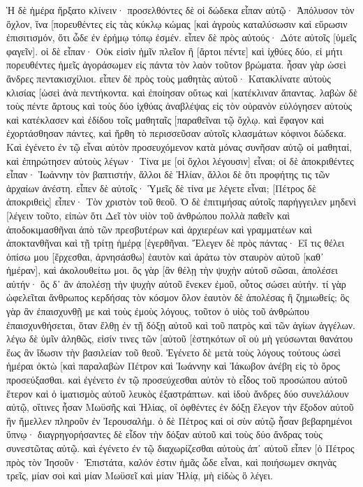 Ἡ δὲ ἡμέρα ἤρξατο κλίνειν· προσελθόντες δὲ οἱ δώδεκα εἶπαν αὐτῷ· Ἀπόλυσον τὸν ὄχλον, ἵνα [πορευθέντες εἰς τὰς κύκλῳ κώμας [καὶ ἀγροὺς καταλύσωσιν καὶ εὕρωσιν ἐπισιτισμόν, ὅτι ὧδε ἐν ἐρήμῳ τόπῳ ἐσμέν. 
εἶπεν δὲ πρὸς αὐτούς· Δότε αὐτοῖς [ὑμεῖς φαγεῖν]. οἱ δὲ εἶπαν· Οὐκ εἰσὶν ἡμῖν πλεῖον ἢ [ἄρτοι πέντε] καὶ ἰχθύες δύο, εἰ μήτι πορευθέντες ἡμεῖς ἀγοράσωμεν εἰς πάντα τὸν λαὸν τοῦτον βρώματα. 
ἦσαν γὰρ ὡσεὶ ἄνδρες πεντακισχίλιοι. εἶπεν δὲ πρὸς τοὺς μαθητὰς αὐτοῦ· Κατακλίνατε αὐτοὺς κλισίας [ὡσεὶ ἀνὰ πεντήκοντα. 
καὶ ἐποίησαν οὕτως καὶ [κατέκλιναν ἅπαντας. 
λαβὼν δὲ τοὺς πέντε ἄρτους καὶ τοὺς δύο ἰχθύας ἀναβλέψας εἰς τὸν οὐρανὸν εὐλόγησεν αὐτοὺς καὶ κατέκλασεν καὶ ἐδίδου τοῖς μαθηταῖς [παραθεῖναι τῷ ὄχλῳ. 
καὶ ἔφαγον καὶ ἐχορτάσθησαν πάντες, καὶ ἤρθη τὸ περισσεῦσαν αὐτοῖς κλασμάτων κόφινοι δώδεκα. 
Καὶ ἐγένετο ἐν τῷ εἶναι αὐτὸν προσευχόμενον κατὰ μόνας συνῆσαν αὐτῷ οἱ μαθηταί, καὶ ἐπηρώτησεν αὐτοὺς λέγων· Τίνα με [οἱ ὄχλοι λέγουσιν] εἶναι; 
οἱ δὲ ἀποκριθέντες εἶπαν· Ἰωάννην τὸν βαπτιστήν, ἄλλοι δὲ Ἠλίαν, ἄλλοι δὲ ὅτι προφήτης τις τῶν ἀρχαίων ἀνέστη. 
εἶπεν δὲ αὐτοῖς· Ὑμεῖς δὲ τίνα με λέγετε εἶναι; [Πέτρος δὲ ἀποκριθεὶς] εἶπεν· Τὸν χριστὸν τοῦ θεοῦ. 
Ὁ δὲ ἐπιτιμήσας αὐτοῖς παρήγγειλεν μηδενὶ [λέγειν τοῦτο, 
εἰπὼν ὅτι Δεῖ τὸν υἱὸν τοῦ ἀνθρώπου πολλὰ παθεῖν καὶ ἀποδοκιμασθῆναι ἀπὸ τῶν πρεσβυτέρων καὶ ἀρχιερέων καὶ γραμματέων καὶ ἀποκτανθῆναι καὶ τῇ τρίτῃ ἡμέρᾳ [ἐγερθῆναι. 
Ἔλεγεν δὲ πρὸς πάντας· Εἴ τις θέλει ὀπίσω μου [ἔρχεσθαι, ἀρνησάσθω] ἑαυτὸν καὶ ἀράτω τὸν σταυρὸν αὐτοῦ [καθ᾽ ἡμέραν], καὶ ἀκολουθείτω μοι. 
ὃς γὰρ [ἂν θέλῃ τὴν ψυχὴν αὐτοῦ σῶσαι, ἀπολέσει αὐτήν· ὃς δ᾽ ἂν ἀπολέσῃ τὴν ψυχὴν αὐτοῦ ἕνεκεν ἐμοῦ, οὗτος σώσει αὐτήν. 
τί γὰρ ὠφελεῖται ἄνθρωπος κερδήσας τὸν κόσμον ὅλον ἑαυτὸν δὲ ἀπολέσας ἢ ζημιωθείς; 
ὃς γὰρ ἂν ἐπαισχυνθῇ με καὶ τοὺς ἐμοὺς λόγους, τοῦτον ὁ υἱὸς τοῦ ἀνθρώπου ἐπαισχυνθήσεται, ὅταν ἔλθῃ ἐν τῇ δόξῃ αὐτοῦ καὶ τοῦ πατρὸς καὶ τῶν ἁγίων ἀγγέλων. 
λέγω δὲ ὑμῖν ἀληθῶς, εἰσίν τινες τῶν [αὐτοῦ [ἑστηκότων οἳ οὐ μὴ γεύσωνται θανάτου ἕως ἂν ἴδωσιν τὴν βασιλείαν τοῦ θεοῦ. 
Ἐγένετο δὲ μετὰ τοὺς λόγους τούτους ὡσεὶ ἡμέραι ὀκτὼ [καὶ παραλαβὼν Πέτρον καὶ Ἰωάννην καὶ Ἰάκωβον ἀνέβη εἰς τὸ ὄρος προσεύξασθαι. 
καὶ ἐγένετο ἐν τῷ προσεύχεσθαι αὐτὸν τὸ εἶδος τοῦ προσώπου αὐτοῦ ἕτερον καὶ ὁ ἱματισμὸς αὐτοῦ λευκὸς ἐξαστράπτων. 
καὶ ἰδοὺ ἄνδρες δύο συνελάλουν αὐτῷ, οἵτινες ἦσαν Μωϋσῆς καὶ Ἠλίας, 
οἳ ὀφθέντες ἐν δόξῃ ἔλεγον τὴν ἔξοδον αὐτοῦ ἣν ἤμελλεν πληροῦν ἐν Ἰερουσαλήμ. 
ὁ δὲ Πέτρος καὶ οἱ σὺν αὐτῷ ἦσαν βεβαρημένοι ὕπνῳ· διαγρηγορήσαντες δὲ εἶδον τὴν δόξαν αὐτοῦ καὶ τοὺς δύο ἄνδρας τοὺς συνεστῶτας αὐτῷ. 
καὶ ἐγένετο ἐν τῷ διαχωρίζεσθαι αὐτοὺς ἀπ᾽ αὐτοῦ εἶπεν [ὁ Πέτρος πρὸς τὸν Ἰησοῦν· Ἐπιστάτα, καλόν ἐστιν ἡμᾶς ὧδε εἶναι, καὶ ποιήσωμεν σκηνὰς τρεῖς, μίαν σοὶ καὶ μίαν Μωϋσεῖ καὶ μίαν Ἠλίᾳ, μὴ εἰδὼς ὃ λέγει. 
